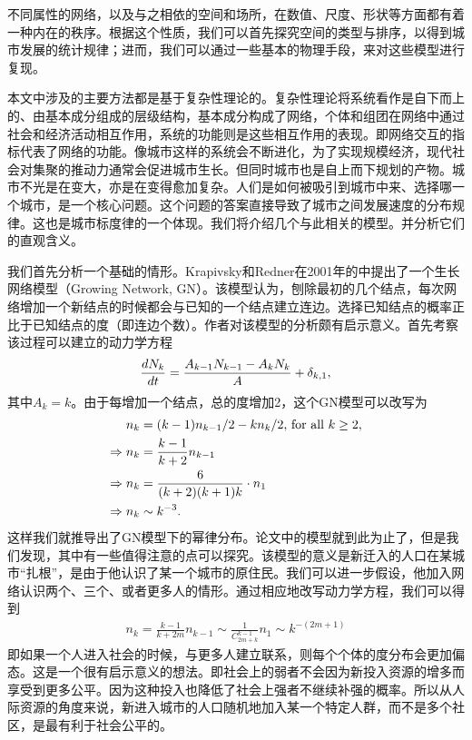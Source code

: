 不同属性的网络，以及与之相依的空间和场所，在数值、尺度、形状等方面都有着一种内在的秩序。根据这个性质，我们可以首先探究空间的类型与排序，以得到城市发展的统计规律；进而，我们可以通过一些基本的物理手段，来对这些模型进行复现。

本文中涉及的主要方法都是基于复杂性理论的。复杂性理论将系统看作是自下而上的、由基本成分组成的层级结构，基本成分构成了网络，个体和组团在网络中通过社会和经济活动相互作用，系统的功能则是这些相互作用的表现。即网络交互的指标代表了网络的功能。像城市这样的系统会不断进化，为了实现规模经济，现代社会对集聚的推动力通常会促进城市生长。但同时城市也是自上而下规划的产物。城市不光是在变大，亦是在变得愈加复杂。人们是如何被吸引到城市中来、选择哪一个城市，是一个核心问题。这个问题的答案直接导致了城市之间发展速度的分布规律。这也是城市标度律的一个体现。我们将介绍几个与此相关的模型。并分析它们的直观含义。

我们首先分析一个基础的情形。Krapivsky和Redner在2001年的\cite{PhysRevE.63.066123}中提出了一个生长网络模型（Growing Network, GN）。该模型认为，刨除最初的几个结点，每次网络增加一个新结点的时候都会与已知的一个结点建立连边。选择已知结点的概率正比于已知结点的度（即连边个数）。作者对该模型的分析颇有启示意义。首先考察该过程可以建立的动力学方程
\begin{align} 
    \frac{dN_k}{dt} = \frac{A_{k-1}N_{k-1} - A_k N_k}{A} + \delta_{k,1},\notag
\end{align}其中$A_k=k$。由于每增加一个结点，总的度增加2，这个GN模型可以改写为\begin{align}n_k &= (k-1)n_{k-1}/2 - kn_{k}/2 \text{, for all }k \geq 2, \notag\\
    \Rightarrow n_k &= \frac{k-1}{k+2}n_{k-1}\notag\\ 
    \Rightarrow n_k &= \frac{6}{(k+2)(k+1)k}\cdot n_1\notag\\ 
    \Rightarrow n_k &\sim k^{-3}.
\end{align}这样我们就推导出了GN模型下的幂律分布。论文中的模型就到此为止了，但是我们发现，其中有一些值得注意的点可以探究。该模型的意义是新迁入的人口在某城市“扎根”，是由于他认识了某一个城市的原住民。我们可以进一步假设，他加入网络认识两个、三个、或者更多人的情形。通过相应地改写动力学方程，我们可以得到\begin{align}
    n_k = \frac{k-1}{k+2m}n_{k-1}\sim\frac{1}{C_{2m+k}^{k-1}}n_1\sim k^{-(2m+1)} \label{degm}
\end{align}即如果一个人进入社会的时候，与更多人建立联系，则每个个体的度分布会更加偏态。这是一个很有启示意义的想法。即社会上的弱者不会因为新投入资源的增多而享受到更多公平。因为这种投入也降低了社会上强者不继续补强的概率。所以从人际资源的角度来说，新进入城市的人口随机地加入某一个特定人群，而不是多个社区，是最有利于社会公平的。

